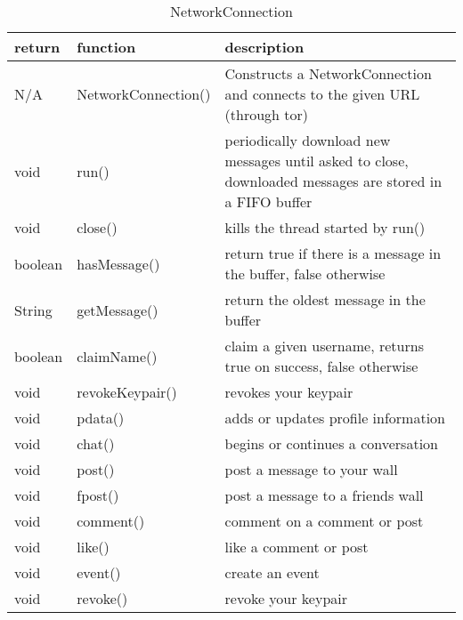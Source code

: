 \begin{table}[h]
    \centering
    \begin{tabular}{p{1cm}p{2.8cm}p{9cm}}
    return   & function            & description\\ \hline
    N/A      & NetworkConnection() & Constructs a NetworkConnection and connects to the given URL (through tor)\\
    void     & run()               & periodically download new messages until asked to close, downloaded messages are stored in a FIFO buffer\\
    void     & close()             & kills the thread started by run()\\
    boolean  & hasMessage()        & return true if there is a message in the buffer, false otherwise\\
    String   & getMessage()        & return the oldest message in the buffer\\
    
    boolean  & claimName()     & claim a given username, returns true on success, false otherwise\\
    void     & revokeKeypair() & revokes your keypair\\
    void     & pdata()         & adds or updates profile information\\
    void     & chat()          & begins or continues a conversation\\
    void     & post()          & post a message to your wall\\
    void     & fpost()         & post a message to a friends wall\\
    void     & comment()       & comment on a comment or post\\
    void     & like()          & like a comment or post\\
    void     & event()         & create an event\\
    void     & revoke()        & revoke your keypair\\
    \end{tabular}
    \caption{NetworkConnection}
\end{table}

